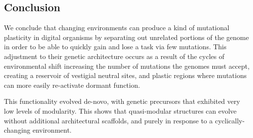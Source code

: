 \subsection{Conclusion}

We conclude that changing environments can produce a kind of mutational plasticity in digital organisms by separating out unrelated portions of the genome in order to be able to quickly gain and lose a task via few mutations. This adjustment to their genetic architecture occurs as a result of the cycles of environmental shift increasing the number of mutations the genomes must accept, creating a reservoir of vestigial neutral sites, and plastic regions where mutations can more easily re-activate dormant function.

This functionality evolved de-novo, with genetic precursors that exhibited very low levels of modularity. This shows that quasi-modular structures can evolve without additional architectural scaffolds, and purely in response to a cyclically-changing environment. 